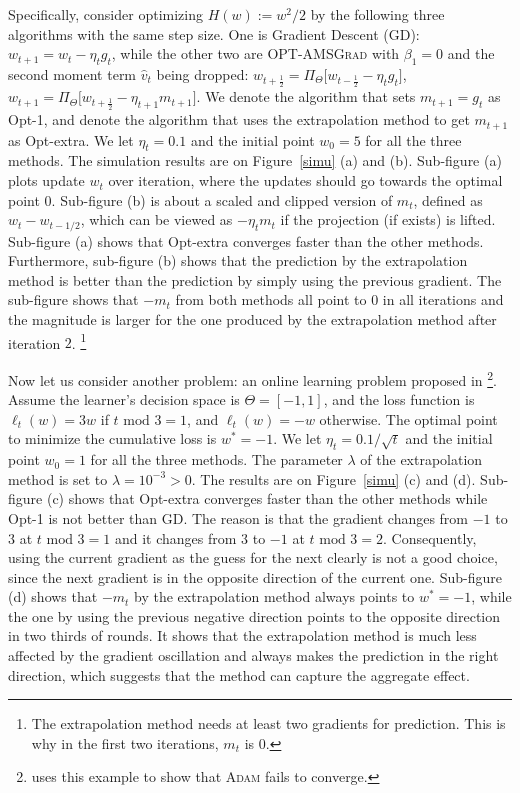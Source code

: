 \documentclass[11pt]{article}
\theoremstyle{k}
\begin{document}
Specifically, consider optimizing $H(w) := w^2/2 $ 
by the following three algorithms with the same step size.
One is Gradient Descent (GD): $w_{t+1} = w_t - \eta_t g_t$,
while the other two are
\textsc{OPT-AMSGrad} with $\beta_1=0$ and the second moment term $\hat{v}_t$ being dropped: 
$w_{t+\frac{1}{2}} = \Pi_{\Theta}\big[ w_{t-\frac{1}{2}} - \eta_t g_t \big]$,
$w_{t+1} = \Pi_{\Theta}\big[ w_{t+\frac{1}{2}} - \eta_{t+1} m_{t+1} \big]$.
We denote the algorithm that sets $m_{t+1}= g_t$ as Opt-1,
and denote the algorithm that uses the extrapolation method
to get $m_{t+1}$ as Opt-extra.
We let $\eta_t=0.1$ and the initial point $w_0=5$ for all the three methods. 
The simulation results are on Figure~\ref{simu} (a) and (b). Sub-figure (a) plots update $w_t$ over iteration, where the updates should go towards the optimal point $0$.
Sub-figure (b) is about a scaled and clipped version of $m_t$, defined as $w_t - w_{t-1/2}$,
which can be viewed as $- \eta_t m_{t}$ if the projection (if exists) is lifted.
Sub-figure (a) shows that Opt-extra converges faster than the other methods. 
Furthermore, sub-figure (b) shows that the prediction by the extrapolation
method is better than the prediction by simply using the previous gradient. The sub-figure shows that
$-m_t$ from both methods all point to $0$ in all iterations and the magnitude is larger for the one produced by the extrapolation method after iteration $2$. \footnote{
The extrapolation method needs at least two gradients for prediction.
This is why in the first two iterations, $m_t$ is $0$.
}


Now let us consider another problem: an online learning problem proposed in \citep{RKK18}
\footnote{\citep{RKK18} uses this example to show that \textsc{Adam} \citep{KB15} fails to converge.}.
Assume the learner's decision space is $\Theta=[-1,1]$, and
the loss function is $\ell_t(w) = 3 w$ if $t \text{ mod } 3 = 1$,
and $\ell_t(w) = - w$ otherwise.
The optimal point to minimize the cumulative loss is $w^*=-1$.
We let $\eta_t=0.1 / \sqrt{t}$ and the initial point $w_0=1$ for all the three methods.
The parameter $\lambda$ of the extrapolation method is set to $\lambda=10^{-3}>0$.
The results are on Figure~\ref{simu} (c) and (d).
Sub-figure (c) shows that Opt-extra converges faster than the other methods
while Opt-1 is not better than GD.
The reason is that the gradient changes from $-1$ to $3$ at $t \text{ mod } 3 = 1$
and it changes from $3$ to $-1$ at $t \text{ mod } 3 = 2$.
Consequently, using the current gradient as the guess for the next clearly is not a good choice,
since the next gradient is in the opposite direction of the current one.
Sub-figure (d) shows that $-m_t$ by the extrapolation method always points to
$w^*=-1$, while the one by using the previous negative direction points to the opposite direction in two thirds of rounds. It shows that the extrapolation method is much less affected by the gradient oscillation and always makes the prediction in the right direction, which suggests that the method can capture the aggregate effect.



\end{document}
